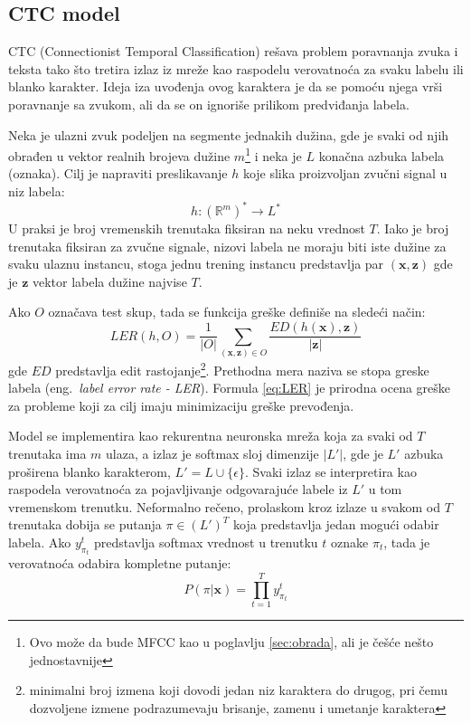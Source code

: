 \documentclass[a4paper]{article}
\begin{document}
\subsection{CTC model}
\label{sec:ctc}

CTC (Connectionist Temporal Classification) rešava problem poravnanja zvuka i teksta tako što tretira izlaz iz mreže kao raspodelu verovatnoća za svaku labelu ili blanko karakter.
Ideja iza uvođenja ovog karaktera je da se pomoću njega vrši poravnanje sa zvukom, ali da se on ignoriše prilikom predviđanja labela.

Neka je ulazni zvuk podeljen na segmente jednakih dužina, gde je svaki od njih obrađen u vektor realnih brojeva dužine $m$\footnote{Ovo može da bude MFCC kao u poglavlju \ref{sec:obrada}, ali je češće nešto jednostavnije} i neka je $L$ konačna azbuka labela (oznaka).
Cilj je napraviti preslikavanje $h$ koje slika proizvoljan zvučni signal u niz labela:
\begin{equation}
\label{eq:pres1}
h: (\mathbb{R}^m)^* \rightarrow L^* 
\end{equation}
U praksi je broj vremenskih trenutaka fiksiran na neku vrednost $T$.
Iako je broj trenutaka fiksiran za zvučne signale, nizovi labela ne moraju biti iste dužine za svaku ulaznu instancu, stoga jednu trening instancu predstavlja par $(\textbf{x}, \textbf{z})$ gde je $\textbf{z}$ vektor labela dužine najvise $T$.

Ako $O$ označava test skup, tada se funkcija greške definiše na sledeći način:
\begin{equation}
\label{eq:LER}
LER(h, O) = \frac{1}{|O|}\sum_{(\textbf{x}, \textbf{z}) \in O}\frac{ED(h(\textbf{x}), \textbf{z})}{\textbf{|z|}}
\end{equation}
gde $ED$ predstavlja edit rastojanje\footnote{minimalni broj izmena koji dovodi jedan niz karaktera do drugog, pri čemu dozvoljene izmene podrazumevaju brisanje, zamenu i umetanje karaktera}. Prethodna mera naziva se stopa greske labela (eng.~{\em label error rate - LER}).
Formula \ref{eq:LER} je prirodna ocena greške za probleme koji za cilj imaju minimizaciju greške prevođenja.

Model se implementira kao rekurentna neuronska mreža koja za svaki od $T$ trenutaka ima $m$ ulaza, a izlaz je softmax sloj dimenzije $|L'|$, gde je $L'$ azbuka proširena blanko karakterom, $L' = L \cup \{\epsilon\}$.
Svaki izlaz se interpretira kao raspodela verovatnoća za pojavljivanje odgovarajuće labele iz $L'$ u tom vremenskom trenutku.
Neformalno rečeno, prolaskom kroz izlaze u svakom od $T$ trenutaka dobija se putanja $\pi \in (L')^T$ koja predstavlja jedan mogući odabir labela.
Ako $y_{\pi_t}^t$ predstavlja softmax vrednost u trenutku $t$ oznake $\pi_t$, tada je verovatnoća odabira kompletne putanje:
\begin{equation*}
  P(\pi|\textbf{x}) = \prod_{t=1}^Ty_{\pi_t}^t
\end{equation*}
\end{document}

